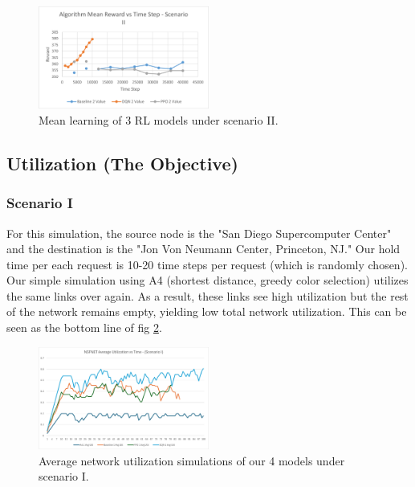 \documentclass[conference]{IEEEtran}
\begin{document}
\begin{figure} [ht]
    \centering
    \includegraphics[width = 0.5\textwidth]{Scenario 2 Mean Reward.png}
    \caption{Mean learning of 3 RL models under scenario II.}
    \label{fig:mean scenario 2}
\end{figure}


\subsection{Utilization (The Objective)}

\subsubsection{Scenario I}

For this simulation, the source node is the "San Diego Supercomputer Center" and the destination is the "Jon Von Neumann Center, Princeton, NJ." Our hold time per each request is 10-20 time steps per request (which is randomly chosen). Our simple simulation using A4 (shortest distance, greedy color selection) utilizes the same links over again. As a result, these links see high utilization but the rest of the network remains empty, yielding low total network utilization. This can be seen as the bottom line of fig \ref{fig:util scenario 1}.

\begin{figure} [ht]
    \centering
    \includegraphics[width = 0.5\textwidth]{Scenario 1 Util.png}
    \caption{Average network utilization simulations of our 4 models under scenario I.}
    \label{fig:util scenario 1}
\end{figure}
\end{document}
